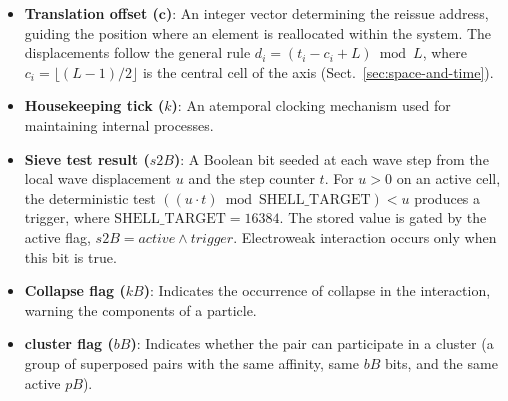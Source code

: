 \documentclass[a4paper]{article}
\begin{document}
\begin{itemize}
\item \textbf{Translation offset ($\mathbf{c}$)}: An integer vector determining the reissue address, guiding the position where an element is reallocated within the system. The displacements follow the general rule $d_i = (t_i - c_i + L) \bmod L$, where $c_i = \lfloor (L-1)/2 \rfloor$ is the central cell of the axis (Sect.~\ref{sec:space-and-time}).
\item \textbf{Housekeeping tick ($k$)}: An atemporal clocking mechanism used for maintaining internal processes.
\item \textbf{Sieve test result ($s2B$)}: A Boolean bit seeded at each wave step from the local wave displacement $u$ and the step counter $t$. For $u > 0$ on an active cell, the deterministic test $((u \cdot t) \bmod \mathrm{SHELL\_TARGET}) < u$ produces a trigger, where $\mathrm{SHELL\_TARGET} = 16384$. The stored value is gated by the active flag, $s2B = \mathit{active} \land \mathit{trigger}$. Electroweak interaction occurs only when this bit is true.
\item \textbf{Collapse flag ($kB$)}: Indicates the occurrence of collapse in the interaction, warning the components of a particle.
\item \textbf{cluster flag ($bB$)}: Indicates whether the pair can participate in a cluster (a group of superposed pairs with the same affinity, same $bB$ bits, and the same active $pB$).
\end{itemize}
\end{document}
